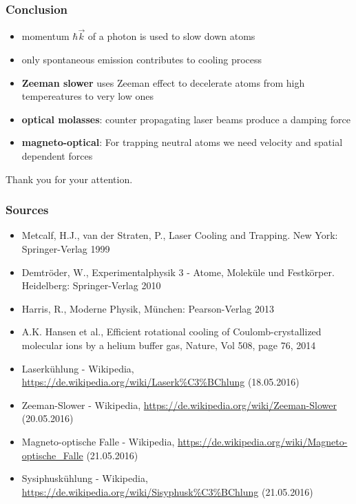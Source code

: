 \documentclass[aspectratio=169]{beamer}
\begin{document}
\begin{frame}
  \frametitle{Conclusion}
  \begin{itemize}
  \item momentum $\hbar \vec{k}$ of a photon is used to slow down atoms
  \item only spontaneous emission contributes to cooling process
  \item \textbf{Zeeman slower} uses Zeeman effect to decelerate atoms from high tempereatures to very low ones
  \item \textbf{optical molasses}: counter propagating laser beams produce a damping force
  \item \textbf{magneto-optical}: For trapping neutral atoms we need velocity and spatial dependent forces
  \end{itemize}
\end{frame}

\begin{frame}
  \begin{center}
    {\Huge Thank you for your attention.}
  \end{center}

\end{frame}

\begin{frame}
  \frametitle{Sources}
  {\small
  \begin{itemize}
    \item Metcalf, H.J., van der Straten, P., Laser Cooling and Trapping. New York: Springer-Verlag 1999
    \item Demtröder, W., Experimentalphysik 3 - Atome, Moleküle und Festkörper. Heidelberg: Springer-Verlag 2010
    \item Harris, R., Moderne Physik, München: Pearson-Verlag 2013
    \item A.K. Hansen et al., Efficient rotational cooling of Coulomb-crystallized
molecular ions by a helium buffer gas, Nature, Vol 508, page 76, 2014
    \item Laserkühlung - Wikipedia, \url{https://de.wikipedia.org/wiki/Laserk\%C3\%BChlung} (18.05.2016)
    \item Zeeman-Slower - Wikipedia, \url{https://de.wikipedia.org/wiki/Zeeman-Slower} (20.05.2016)
    \item Magneto-optische Falle - Wikipedia, \url{https://de.wikipedia.org/wiki/Magneto-optische_Falle} (21.05.2016)
    \item Sysiphuskühlung - Wikipedia, \url{https://de.wikipedia.org/wiki/Sisyphusk\%C3\%BChlung} (21.05.2016)
  \end{itemize}
  }
\end{frame}
\end{document}
